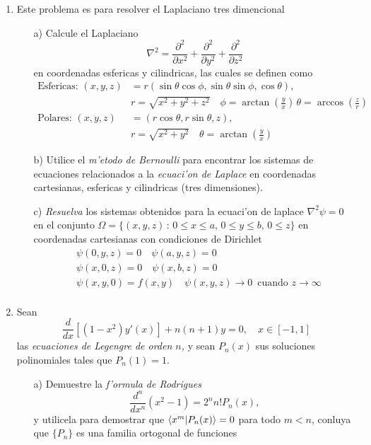 \documentclass[letterpaper]{article}
\begin{document}
\begin{enumerate}
  \item Este problema es para resolver el Laplaciano tres dimencional
        \begin{itemize}
                \item[a)] Calcule el Laplaciano
        \[
        \nabla^{2}=\dfrac{\partial^{2}}{\partial x^{2}}+\dfrac{\partial^{2}}{\partial y^{2}}+\dfrac{\partial^{2}}{\partial z^{2}}
        \]
        en coordenadas esfericas y cilindricas, las cuales se definen como
        \begin{align*}
          \text{Esfericas: }(x,y,z)&=r(\sin\theta\cos\phi,\sin\theta\sin\phi,\cos\theta),\\ &r=\sqrt{x^{2}+y^{2}+z^{2}}\quad\phi=\arctan\left(\frac{y}{x}\right)\,\theta=\arccos\left(\frac{z}{r}\right)\\
          \text{Polares: }(x,y,z)&=(r\cos\theta,r\sin\theta,z),\\
          &r=\sqrt{x^{2}+y^{2}}\quad\theta=\arctan\left(\frac{y}{x}\right)
        \end{align*}
          \item[b)] Utilice el \emph{m'etodo de Bernoulli} para encontrar los sistemas de ecuaciones relacionados a la \emph{ecuaci'on de Laplace} en coordenadas cartesianas, esfericas y cilindricas (tres dimensiones).
          \item[c)] \emph{Resuelva} los sistemas obtenidos para la ecuaci'on de laplace $\nabla^{2}\psi=0$ en el conjunto $\Omega=\{(x,y,z)\,:\,0\leq x\leq a,\,0\leq y\leq b, \,0\leq z\}$ en coordenadas cartesianas con condiciones de Dirichlet
        \begin{align*}
          &\psi(0,y,z)=0\quad\psi(a,y,z)=0\\
          &\psi(x,0,z)=0\quad\psi(x,b,z)=0\\
          &\psi(x,y,0)=f(x,y)\quad\psi(x,y,z)\to0\,\text{ cuando }z\to\infty\\
        \end{align*}
  \end{itemize}
  \item Sean
\begin{equation}
  \dfrac{d}{dx}\left[(1-x^{2})y'(x)\right]+n(n+1)y=0,\quad x\in [-1,1]
\end{equation}
        las \emph{ecuaciones de Legengre de orden \(n\),} y sean $P_{n}(x)$ sus soluciones polinomiales tales que $P_{n}(1)=1$.
        \begin{itemize}
          \item[a)] Demuestre la \emph{f'ormula de Rodrigues}
                \[
                \dfrac{d^{n}}{dx^{n}}(x^{2}-1)=2^{n}n!P_{n}(x),
                \]
                y utilicela para demostrar que $\braket{x^{m}|P_{n}(x)}=0$ para todo $m<n$, conluya que $\{P_{n}\}$ es una familia ortogonal de funciones


\end{itemize}
\end{enumerate}
\end{document}
